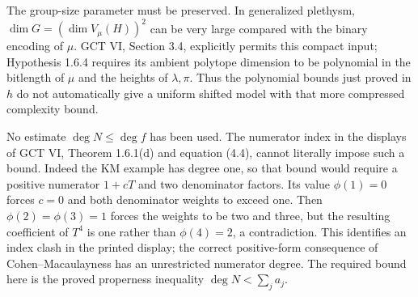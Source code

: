 The group-size parameter must be preserved. In generalized plethysm,
$\dim G=(\dim V_\mu(H))^2$ can be very large compared with the binary
encoding of $\mu$. GCT VI, Section 3.4, explicitly permits this compact
input; Hypothesis 1.6.4 requires its ambient polytope dimension to be
polynomial in the bitlength of $\mu$ and the heights of $\lambda,\pi$.
Thus the polynomial bounds just proved in $h$ do not automatically give
a uniform shifted model with that more compressed complexity bound.

No estimate $\deg N\le\deg f$ has been used. The numerator index in
the displays of GCT VI, Theorem 1.6.1(d) and equation (4.4), cannot
literally impose such a bound. Indeed the KM example has degree one,
so that bound would require a positive numerator $1+cT$ and two
denominator factors. Its value $\phi(1)=0$ forces $c=0$ and both
denominator weights to exceed one. Then $\phi(2)=\phi(3)=1$ forces
the weights to be two and three, but the resulting coefficient of
$T^4$ is one rather than $\phi(4)=2$, a contradiction. This identifies
an index clash in the printed display; the correct positive-form
consequence of Cohen--Macaulayness has an unrestricted numerator degree.
The required bound here is the proved properness inequality
$\deg N<\sum_j a_j$.
